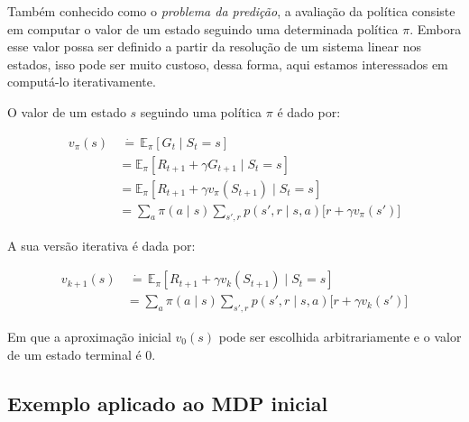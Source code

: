 \documentclass{article}
\begin{document}
        Também conhecido como o \textit{problema da predição}, a avaliação da política consiste em computar o valor de um estado seguindo uma determinada política $\pi$. Embora esse valor possa ser definido a partir da resolução de um sistema linear nos estados, isso pode ser muito custoso, dessa forma, aqui estamos interessados em computá-lo iterativamente.
        
        O valor de um estado $s$ seguindo uma política $\pi$ é dado por:
        
        \begin{equation}
            \begin{split}
                v_{\pi}(s) & \ \dot{=} \, \mathbb{E}_{\pi} \left[ G_t \mid S_t = s \right] \\
                & = \mathbb{E}_{\pi} \left[ R_{t+1} + \gamma G_{t+1} \mid S_t = s \right] \\
                & = \mathbb{E}_{\pi} \left[ R_{t+1} + \gamma v_{\pi}(S_{t+1}) \mid S_t = s \right] \\
                & = \sum_a \pi(a \mid s) \sum_{s',r} p(s',r \mid s,a) \Big[ r + \gamma v_{\pi}(s') \Big]
            \end{split}
        \end{equation}
                
        A sua versão iterativa é dada por:
        
        \begin{equation}
            \begin{split}
                v_{k+1}(s) & \ \dot{=} \, \mathbb{E}_{\pi} \left[ R_{t+1} + \gamma v_k(S_{t+1}) \mid S_t = s \right] \\
                & = \sum_a \pi(a \mid s) \sum_{s',r} p(s',r \mid s,a) \Big[ r + \gamma v_k(s') \Big]
            \end{split}
        \end{equation}
        
        Em que a aproximação inicial $v_0(s)$ pode ser escolhida arbitrariamente e o valor de um estado terminal é $0$.
        
        \subsection{Exemplo aplicado ao MDP inicial}
        
\end{document}
